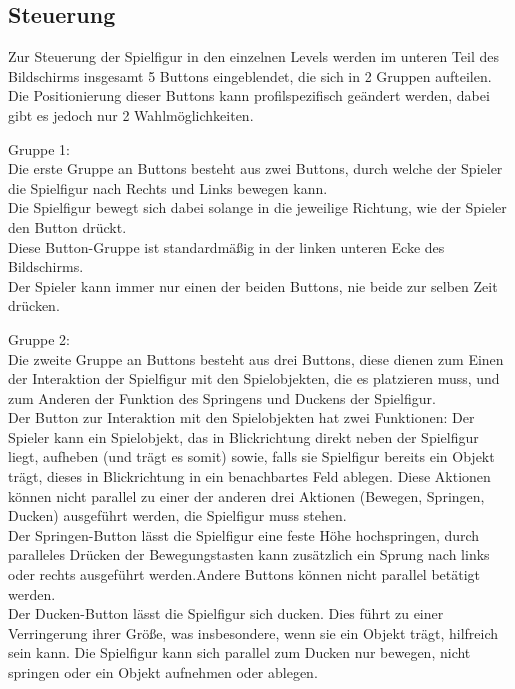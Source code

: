\documentclass{scrartcl}
\begin{document}
\subsection{Steuerung}  \label{subsection:Steuerung}

Zur Steuerung der Spielfigur in den einzelnen Levels werden im unteren Teil des Bildschirms insgesamt 5 Buttons eingeblendet, die sich in 2 Gruppen aufteilen.\\
Die Positionierung dieser Buttons kann profilspezifisch geändert werden, dabei gibt es jedoch nur 2 Wahlmöglichkeiten.\\

\begin{enumerate}
	\begin{minipage}{1\textwidth}
			\item Gruppe 1:\\
			Die erste Gruppe an Buttons besteht aus zwei Buttons, durch welche der Spieler die Spielfigur nach Rechts und Links bewegen kann.\\
			Die Spielfigur bewegt sich dabei solange in die jeweilige Richtung, wie der Spieler den Button drückt.\\
			Diese Button-Gruppe ist standardmäßig in der linken unteren Ecke des Bildschirms.\\
			Der Spieler kann immer nur einen der beiden Buttons, nie beide zur selben Zeit drücken.\\
	\end{minipage}
	
	\begin{minipage}{1\textwidth}
			\item Gruppe 2:\\
			Die zweite Gruppe an Buttons besteht aus drei Buttons, diese dienen zum Einen der Interaktion der Spielfigur mit den Spielobjekten, die es platzieren muss, und zum Anderen der Funktion des Springens und Duckens der Spielfigur.\\
			Der Button zur Interaktion mit den Spielobjekten hat zwei Funktionen: Der Spieler kann ein Spielobjekt, das in Blickrichtung direkt neben der Spielfigur liegt, aufheben (und trägt es somit) sowie, falls sie Spielfigur bereits ein Objekt trägt, dieses in Blickrichtung in ein benachbartes Feld ablegen. Diese Aktionen können nicht parallel zu einer der anderen drei Aktionen (Bewegen, Springen, Ducken) ausgeführt werden, die Spielfigur muss stehen.\\
			Der Springen-Button lässt die Spielfigur eine feste Höhe hochspringen, durch paralleles Drücken der Bewegungstasten kann zusätzlich ein Sprung nach links oder rechts ausgeführt werden.Andere Buttons können nicht parallel betätigt werden.\\
			Der Ducken-Button lässt die Spielfigur sich ducken. Dies führt zu einer Verringerung ihrer Größe, was insbesondere, wenn sie ein Objekt trägt, hilfreich sein kann. Die Spielfigur kann sich parallel zum Ducken nur bewegen, nicht springen oder ein Objekt aufnehmen oder ablegen.\\
	\end{minipage}


\end{enumerate}
\end{document}
